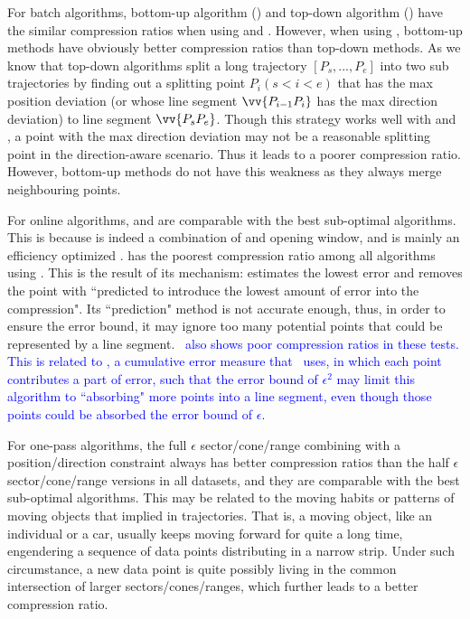 For batch algorithms, bottom-up algorithm (\tpa) and top-down algorithm (\dpa) have the similar compression ratios when using \ped and \sed. However, when using \dad, bottom-up methods have obviously better compression ratios than top-down methods.  As we know that top-down algorithms split a long trajectory $[P_s, ..., P_e]$ into two sub trajectories by finding out a splitting point $P_i (s<i<e)$ that has the max position deviation (or whose line segment $\vv{P_{i-1}P_{i}}$ has the max direction deviation) to line segment $\vv{P_sP_{e}}$. Though this strategy works well with \ped and \sed, a point with the max direction deviation may not be a reasonable splitting point in the direction-aware scenario. Thus it leads to a poorer compression ratio. However, bottom-up methods do not have this weakness as they always merge neighbouring points.



For online algorithms, \bqsa and \opwa are comparable with the best sub-optimal algorithms. This is because \opwa is indeed a combination of \dpa and opening window, and \bqsa is mainly an efficiency optimized \opwa.
\squishe has the poorest compression ratio among all algorithms using \sed. This is the result of its mechanism: \squishe estimates the lowest \sed error and removes the point with ``predicted to introduce the lowest amount of error into the compression"\cite{Muckell:SQUISH}. Its ``prediction" method is not accurate enough, thus, in order to ensure the error bound, it may ignore too many potential points that could be represented by a line segment. \textcolor{blue}{\dagots~also shows poor compression ratios in these tests. This is related to \lissed, a cumulative error measure that \dagots~uses, in which each point contributes a part of error, such that the \lissed error bound of $\epsilon^2$ may limit this algorithm to ``absorbing" more points into a line segment, even though those points could be absorbed \wrt the  \sed error bound of $\epsilon$.}

For one-pass algorithms, the full $\epsilon$ sector/cone/range combining with a position/direction constraint always has better compression ratios than the half $\epsilon$ sector/cone/range versions in all datasets, and they are comparable with the best sub-optimal algorithms.
This may be related to the moving habits or patterns of moving objects that implied in trajectories.
That is, a moving object, like an individual or a car, usually keeps moving forward for quite a long time, engendering a sequence of data points distributing in a narrow strip. Under such circumstance, a new data point is quite possibly living in the common intersection of larger sectors/cones/ranges, which further leads to a better compression ratio. 

